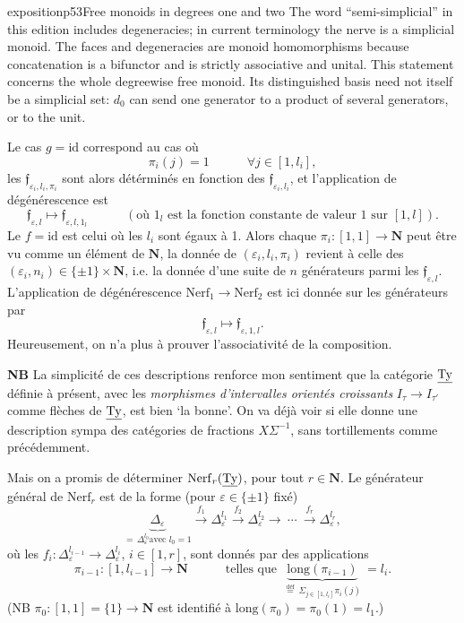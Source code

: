 \begin{dcomment}{exposition}{p53}{Free monoids in degrees one and two}
The word ``semi-simplicial'' in this edition includes degeneracies; in current terminology the nerve is a simplicial monoid. The faces and degeneracies are monoid homomorphisms because concatenation is a bifunctor and is strictly associative and unital. This statement concerns the whole degreewise free monoid. Its distinguished basis need not itself be a simplicial set: $d_0$ can send one generator to a product of several generators, or to the unit.
\end{dcomment}


Le cas $g=\mathrm{id}$ correspond au cas où
\[
\pi_i(j)=1 \qquad\quad \forall j\in[1,l_i],
\]
les $\mathfrak{f}_{\varepsilon_i,l_i,\pi_i}$ sont alors détérminés en fonction des $\mathfrak{f}_{\varepsilon_i,l_i}$, et l'application de dégénérescence est %
\[
\mathfrak{f}_{\varepsilon,l}\longmapsto\mathfrak{f}_{\varepsilon,l,1_l} \qquad\quad (\text{où } 1_l \text{ est la fonction constante de valeur 1 sur } [1,l]).
\]
Le $f=\mathrm{id}$ est celui où les $l_i$ sont égaux à 1. Alors chaque $\pi_i : [1,1]\longrightarrow\mathbf{N}$ peut être vu comme un élément de $\mathbf{N}$, la donnée de $(\varepsilon_i,l_i,\pi_i)$ revient à celle des $(\varepsilon_i,n_i)\in\{\pm1\}\times\mathbf{N}$, i.e. la donnée %
d'une suite de $n$ générateurs parmi les $\mathfrak{f}_{\varepsilon,l}$. L'application de dégénérescence $\mathrm{Nerf}_1\longrightarrow\mathrm{Nerf}_2$ est ici donnée sur les générateurs par
\[
\mathfrak{f}_{\varepsilon,l}\longmapsto\mathfrak{f}_{\varepsilon,1,l}.
\]
Heureusement, on n'a plus à prouver l'associativité de la composition.

\textbf{NB} La simplicité de ces descriptions renforce mon sentiment que la catégorie $\underline{\mathrm{Ty}}$ définie à présent, avec les \textit{morphismes d'intervalles orientés croissants} $I_\tau\longrightarrow I_{\tau'}$ comme flèches de $\underline{\mathrm{Ty}}$, est bien `la bonne'. On va déjà voir si elle donne une description sympa des catégories de fractions $X\Sigma^{-1}$, sans tortillements comme précédemment.

Mais on a promis de déterminer $\mathrm{Nerf}_r(\underline{\mathrm{Ty}})$, pour tout $r\in\mathbf{N}$. Le générateur général de $\mathrm{Nerf}_r$ est de la forme (pour $\varepsilon\in\{\pm1\}$ fixé)
\[
\underbrace{\Delta_\varepsilon}_{=\,\Delta^{l_0}_\varepsilon\text{avec } l_0=1}\xrightarrow{\ f_1\ }\Delta^{l_1}_\varepsilon\xrightarrow{\ f_2\ }\Delta^{l_2}_\varepsilon\longrightarrow\ \cdots\ \xrightarrow{\ f_r\ }\Delta^{l_r}_\varepsilon,
\]
où les $f_i : \Delta^{l_{i-1}}_\varepsilon\longrightarrow\Delta^{l_i}_\varepsilon$, $i\in[1,r]$, sont donnés par des applications
\[
\pi_{i-1} : [1,l_{i-1}]\longrightarrow\mathbf{N} \qquad\quad \text{telles que }\ \underbrace{\mathrm{long}(\pi_{i-1})}_{\overset{\text{déf}}{=}\ \Sigma_{j\in[1,l_i]}\pi_i(j)}\ = l_i. %
\]
(NB $\pi_0 : [1,1]=\{1\}\longrightarrow\mathbf{N}$ est identifié à $\mathrm{long}(\pi_0)=\pi_0(1)=l_1$.)

